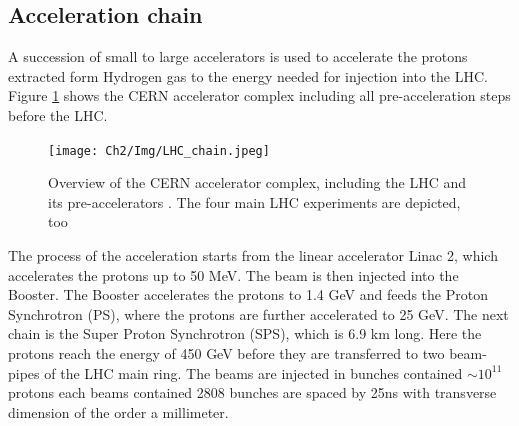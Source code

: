 \subsection{Acceleration chain}
\label{chap2:LHC:chain}
A succession of small to large accelerators is used to accelerate the protons extracted form Hydrogen gas to the energy needed for injection into the LHC. Figure \ref{fig:chap2:LHC:chain} shows the CERN accelerator complex including all pre-acceleration steps before the LHC.
\begin{figure}[ht]
    \centering
    \texttt{[image: Ch2/Img/LHC\_chain.jpeg]}
    \caption{Overview of the CERN accelerator complex, including the LHC and its pre-accelerators \cite{LHC_chain}. The four main LHC experiments are depicted, too}
    \label{fig:chap2:LHC:chain}
\end{figure}
The process of the acceleration starts from the linear accelerator Linac 2, which accelerates the protons up to 50 MeV. The beam is then injected into the Booster. The Booster accelerates the protons to 1.4 GeV and feeds the Proton Synchrotron (PS), where the protons are further accelerated to 25 GeV. The next chain is the Super Proton Synchrotron (SPS), which is 6.9 km long. Here the protons reach the energy of 450 GeV before they are transferred to two beam-pipes of the LHC main ring. The beams are injected in bunches contained $\sim 10^{11}$ protons each beams contained 2808 bunches are spaced by 25ns with transverse dimension of the order a millimeter. 
